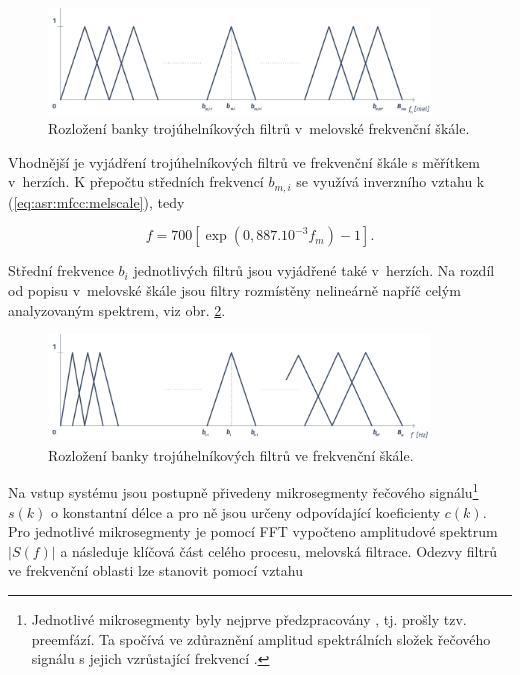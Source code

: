 \begin{figure}[hbpt]
  \centering
  \includegraphics[width=0.9\textwidth]{./ch4-asr/img/filter_bank-mel.pdf}
  \caption{Rozložení banky trojúhelníkových filtrů v~melovské frekvenční škále.}
  \label{fig:asr:mfcc:bank:mel}
\end{figure}

\noindent Vhodnější je vyjádření trojúhelníkových filtrů ve frekvenční škále s měřítkem v~herzích. K přepočtu středních frekvencí $b_{m,i}$ se využívá inverzního vztahu k (\ref{eq:asr:mfcc:melscale}), tedy

\begin{equation}
  f = 700 \left[ \exp\left( 0,887.10^{-3} f_m \right) - 1 \right].
  \label{eq:asr:mfcc:melscale:inverse}
\end{equation}

\noindent Střední frekvence $b_i$ jednotlivých filtrů jsou vyjádřené také v~herzích. Na rozdíl od popisu v~melovské škále jsou filtry rozmístěny nelineárně napříč celým analyzovaným spektrem, viz obr. \ref{fig:asr:mfcc:bank:hz}.

\begin{figure}[hbpt]
  \centering
  \includegraphics[width=0.9\textwidth]{./ch4-asr/img/filter_bank-hz.pdf}
  \caption{Rozložení banky trojúhelníkových filtrů ve frekvenční škále.}
  \label{fig:asr:mfcc:bank:hz}
\end{figure}

Na vstup systému jsou postupně přivedeny mikrosegmenty řečového signálu\footnote{Jednotlivé mikrosegmenty byly nejprve předzpracovány , tj. prošly tzv. preemfází. Ta spočívá ve zdůraznění amplitud spektrálních složek řečového signálu s jejich vzrůstající frekvencí \cite{Psutka2006}.} $s\left(k\right)$ o konstantní délce a pro ně jsou určeny odpovídající koeficienty $c\left(k\right)$. Pro jednotlivé mikrosegmenty je pomocí FFT vypočteno amplitudové spektrum $\left| S(f) \right|$ a následuje klíčová část celého procesu, melovská filtrace. Odezvy filtrů ve frekvenční oblasti lze stanovit pomocí vztahu


